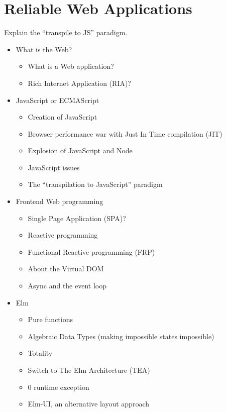 \chapter{Reliable Web Applications}%
\label{cha:reliable_web_applications}

Explain the ``transpile to JS'' paradigm.

\begin{itemize}
	\item What is the Web?
	\begin{itemize}
		\item What is a Web application?
		\item Rich Internet Application (RIA)?
	\end{itemize}
	\item JavaScript or ECMAScript
	\begin{itemize}
		\item Creation of JavaScript
		\item Browser performance war with Just In Time compilation (JIT)
		\item Explosion of JavaScript and Node
		\item JavaScript issues
		\item The ``transpilation to JavaScript'' paradigm
	\end{itemize}
	\item Frontend Web programming
	\begin{itemize}
		\item Single Page Application (SPA)?
		\item Reactive programming
		\item Functional Reactive programming (FRP)
		\item About the Virtual DOM
		\item Async and the event loop
	\end{itemize}
	\item Elm
	\begin{itemize}
		\item Pure functions
		\item Algebraic Data Types (making impossible states impossible)
		\item Totality
		\item Switch to The Elm Architecture (TEA)
		\item 0 runtime exception
		\item Elm-UI, an alternative layout approach
	\end{itemize}
\end{itemize}
